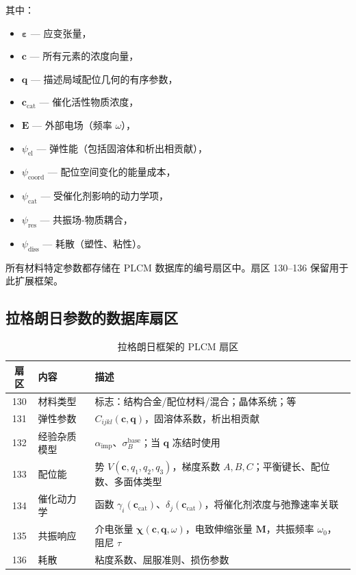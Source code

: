 \documentclass[12pt,a4paper]{article}
\begin{document}
	其中：
	\begin{itemize}
		\item \(\boldsymbol{\varepsilon}\) — 应变张量，
		\item \(\mathbf{c}\) — 所有元素的浓度向量，
		\item \(\mathbf{q}\) — 描述局域配位几何的有序参数，
		\item \(\mathbf{c}_{\mathrm{cat}}\) — 催化活性物质浓度，
		\item \(\mathbf{E}\) — 外部电场（频率 \(\omega\)），
		\item \(\psi_{\mathrm{el}}\) — 弹性能（包括固溶体和析出相贡献），
		\item \(\psi_{\mathrm{coord}}\) — 配位空间变化的能量成本，
		\item \(\psi_{\mathrm{cat}}\) — 受催化剂影响的动力学项，
		\item \(\psi_{\mathrm{res}}\) — 共振场-物质耦合，
		\item \(\psi_{\mathrm{diss}}\) — 耗散（塑性、粘性）。
	\end{itemize}
	
	所有材料特定参数都存储在 PLCM 数据库的编号扇区中。扇区 130–136 保留用于此扩展框架。
	
	\subsection{拉格朗日参数的数据库扇区}
	\label{subsec:sectors}
	
	\begin{table}[htbp]
		\centering
		\caption{拉格朗日框架的 PLCM 扇区}
		\label{tab:sectors}
		\begin{tabular}{clp{8cm}}
			\toprule
			\textbf{扇区} & \textbf{内容} & \textbf{描述} \\
			\midrule
			130 & 材料类型 & 标志：结构合金/配位材料/混合；晶体系统；等 \\
			131 & 弹性参数 & \(C_{ijkl}(\mathbf{c}, \mathbf{q})\)，固溶体系数，析出相贡献 \\
			132 & 经验杂质模型 & \(\alpha_{\mathrm{imp}}\)、\(\sigma_B^{\mathrm{base}}\)；当 \(\mathbf{q}\) 冻结时使用 \\
			133 & 配位能 & 势 \(V(\mathbf{c}, q_1,q_2,q_3)\)，梯度系数 \(A,B,C\)；平衡键长、配位数、多面体类型 \\
			134 & 催化动力学 & 函数 \(\gamma_i(\mathbf{c}_{\mathrm{cat}})\)、\(\delta_j(\mathbf{c}_{\mathrm{cat}})\)，将催化剂浓度与弛豫速率关联 \\
			135 & 共振响应 & 介电张量 \(\boldsymbol{\chi}(\mathbf{c},\mathbf{q},\omega)\)，电致伸缩张量 \(\mathbf{M}\)，共振频率 \(\omega_0\)，阻尼 \(\tau\) \\
			136 & 耗散 & 粘度系数、屈服准则、损伤参数 \\
			\bottomrule
		\end{tabular}
	\end{table}
	
\end{document}
